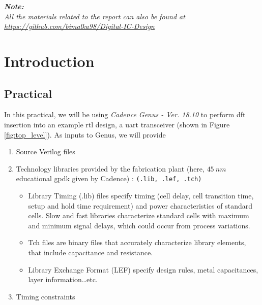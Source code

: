 \documentclass[a4paper,11pt]{article}%
\begin{document}


\pagebreak

\tableofcontents
\vfill
\textit{\textbf{Note:}}\\
\textit{All the materials related to the report can also be found at \url{https://github.com/bimalka98/Digital-IC-Design}}

\pagebreak
\listoffigures
\listoftables




\pagebreak
\section{Introduction}

\subsection{Practical}
In this practical, we will be using \textit{Cadence Genus - Ver. 18.10 } to perform \ac{dft} insertion into an example \ac{rtl} design, a \ac{uart} transceiver (shown in Figure \ref{fig:top_level}). As inputs to Genus, we will provide

\begin{enumerate}
	\item Source Verilog files
	\item Technology libraries provided by the fabrication plant (here, $45~nm$ educational \ac{gpdk} given by Cadence) : {\tt (.lib, .lef, .tch)}
	
	\begin{itemize}
		\item Library Timing (.lib) files specify timing (cell delay, cell transition time, setup and hold time requirement) and power characteristics of standard cells. Slow and fast libraries 	characterize standard cells with maximum and minimum signal delays, which could occur from process variations.

		\item Tch files are binary files that accurately characterize library elements, that include  capacitance and resistance.
		
		\item Library Exchange Format (LEF) specify design rules, metal capacitances, layer information…etc.
	\end{itemize}
	
	\item Timing constraints
\end{enumerate}
\end{document}
